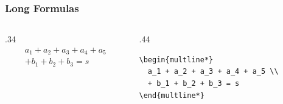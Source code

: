 \documentclass{ltx-talk}
\begin{document}
\begin{frame*}
  \frametitle{Long Formulas}
  \begin{columns}
    \begin{column}{.34\textwidth}
      \begin{multline*}
        a_1 + a_2 + a_3 + a_4 + a_5 \\
        + b_1 + b_2 + b_3 = s
      \end{multline*}
    \end{column}
    \begin{column}{.44\textwidth}
\small
\begin{verbatim}
\begin{multline*}
  a_1 + a_2 + a_3 + a_4 + a_5 \\
  + b_1 + b_2 + b_3 = s
\end{multline*}
\end{verbatim}
    \end{column}
  \end{columns}
\end{frame*}
\end{document}
